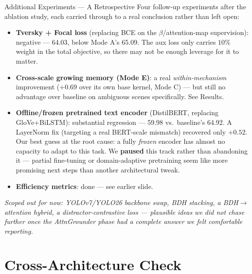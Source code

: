 \documentclass[aspectratio=169]{beamer}
\begin{document}
\begin{frame}{Additional Experiments — A Retrospective}
  \footnotesize Four follow-up experiments after the ablation study,
  each carried through to a real conclusion rather than left open:
  \begin{itemize}\setlength{\itemsep}{3pt}
    \item \textbf{Tversky + Focal loss} (replacing BCE on the
      $\beta$/attention-map supervision): \textcolor{red!70!black}{negative}
      — 64.03, below Mode A's 65.09. The aux loss only carries $10\%$
      weight in the total objective, so there may not be enough
      leverage for it to matter.
    \item \textbf{Cross-scale growing memory (Mode E)}: a real
      \emph{within-mechanism} improvement ($+0.69$ over its own base
      kernel, Mode C) — but still no advantage over baseline on
      ambiguous scenes specifically. See Results.
    \item \textbf{Offline/frozen pretrained text encoder} (DistilBERT,
      replacing GloVe+BiLSTM): \textcolor{red!70!black}{substantial
      regression} — 59.98 vs.\ baseline's 64.92. A LayerNorm fix
      (targeting a real BERT-scale mismatch) recovered only $+0.52$.
      Our best guess at the root cause: a fully \emph{frozen} encoder
      has almost no capacity to adapt to this task. We
      \textbf{paused} this track rather than abandoning it — partial
      fine-tuning or domain-adaptive pretraining seem like more
      promising next steps than another architectural tweak.
    \item \textbf{Efficiency metrics}: done — see earlier slide.
  \end{itemize}
  \vspace{0.15cm}
  \footnotesize\textit{Scoped out for now: YOLOv7/YOLO26 backbone swap,
  BDH stacking, a BDH$\to$attention hybrid, a distractor-contrastive
  loss — plausible ideas we did not chase further once the AttnGrounder
  phase had a complete answer we felt comfortable reporting.}
\end{frame}

\section{Cross-Architecture Check}
\end{document}
